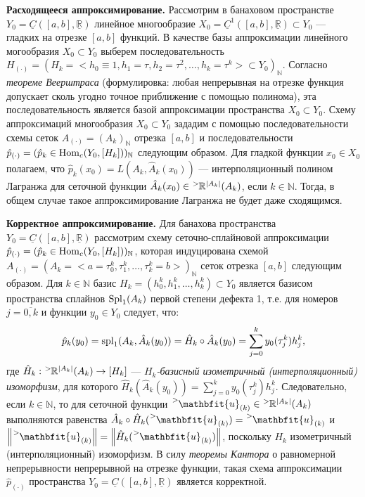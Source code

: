 \begin{example}
	\textbf{Расходящееся аппроксимирование. } Рассмотрим в банаховом пространстве $Y_0 = \underline{C}([a, b], \underline{\mathbb{R}})$ линейное многообразие $X_0 = \underline{C}^1([a, b], \underline{\mathbb{R}}) \subset Y_0$ --- гладких на отрезке $[a, b]$ функций. В качестве базы аппроксимации линейного могообразия $X_0 \subset Y_0$ выберем последовательность $H_{(\cdot)} = \left(H_k = \big<h_0 \equiv 1, h_1 = \tau, h_2 = \tau^2, \dotsc, h_k = \tau^k\big> \subset Y_0\right)_{\mathbb{N}}$. Согласно \textit{теореме Веерштраса} (формулировка: любая непрерывная на отрезке функция допускает сколь угодно точное приближение с помощью полинома), эта последовательность является базой аппроксимации пространства $X_0 \subset Y_0$. Схему аппроксимаций многообразия $X_0 \subset Y_0$ зададим с помощью последовательности схемы сеток $A_{(\cdot)} = (A_k)_{\mathbb{N}}$ отрезка $[a, b]$ и последовательности $\hat{p}_{(\cdot)} = (\hat{p}_k \in \mathrm{Hom}_c(Y_0, [H_k]))_{\mathbb{N}}$ следующим образом. Для гладкой функции $x_0 \in X_0$ полагаем, что $\hat{p}_k(x_0) = L(A_k, \hat{A}_k(x_0))$ --- интерполяционный полином Лагранжа для сеточной функции $\hat{A}_k(x_0) \in \tensor[^{>}]{\mathbb{R}}{^{\abs{A_k}}}(A_k)$, если $k \in \mathbb{N}$. Тогда, в общем случае такое аппроксимирование Лагранжа не будет даже сходящимся.
	
	\textbf{Корректное аппроксимирование. } Для банахова пространства $Y_0 = \underline{C}([a, b], \underline{\mathbb{R}})$ рассмотрим схему сеточно-сплайновой аппроксимации $\hat{p}_{(\cdot)} = (\hat{p}_k \in \mathrm{Hom}_c(Y_0, [H_k]))_{\mathbb{N}}$, которая индуцирована схемой $A_{(\cdot)} = (A_k = \big<a = \tau_0^k, \tau_1^k, \dotsc, \tau_k^k = b\big>)_{\mathbb{N}}$ сеток отрезка $[a, b]$ следующим образом. Для $k \in \mathbb{N}$ базис $H_k = (h_0^k, h_1^k, \dotsc, h_k^k) \subset Y_0$ является базисом пространства сплайнов $\mathrm{Spl}_1(A_k)$ первой степени дефекта 1, т.е. для номеров $j = \overline{0, k}$ и функции $y_0 \in Y_0$ следует, что: 
	\begin{equation*}
		\hat{p}_k(y_0) = \mathrm{spl}_1(A_k, \hat{A}_k(y_0)) = \hat{H}_k \circ \hat{A}_k(y_0) = \sum \limits_{j = 0}^{k} y_0(\tau_j^k) h_j^k,
	\end{equation*} 
	где $\hat{H}_k : \tensor[^{>}]{\mathbb{R}}{^{\abs{A_k}}}(A_k) \to [H_k]$ --- $H_k$\textit{-базисный изометричный (интерполяционный) изоморфизм}, для которого $\hat{H}_k(\hat{A}_k(y_0)) = \sum\limits_{j = 0}^{k} y_0(\tau^k_j) h^k_j$. Следовательно, если $k \in \mathbb{N}$, то для сеточной функции $\tensor[^{>}]{\mathbfit{u}}{_{(k)}} \in \tensor[^{>}]{\mathbb{R}}{^{\abs{A_k}}}(A_k)$ выполняются равенства $\hat{A}_k \circ \hat{H}_k (\tensor[^{>}]{\mathbfit{u}}{_{(k)}}) = \tensor[^{>}]{\mathbfit{u}}{_{(k)}}$ и $\norm{\tensor[^{>}]{\mathbfit{u}}{_{(k)}}} = \norm{\hat{H}_k(\tensor[^{>}]{\mathbfit{u}}{_{(k)}})}$, поскольку $H_k$ изометричный (интерполяционный) изоморфизм. В силу \textit{теоремы Кантора} о равномерной непрерывности непрерывной на отрезке функции, такая схема аппроксимации $\hat{p}_{(\cdot)}$ пространства $Y_0 = \underline{C}([a, b], \underline{\mathbb{R}})$ является корректной. 
\end{example}